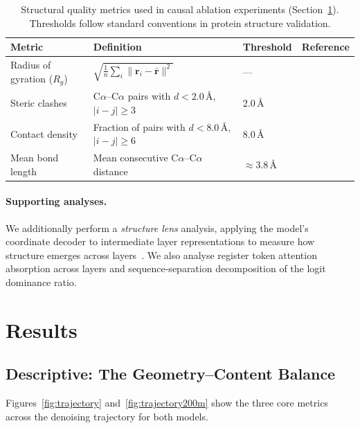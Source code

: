 \documentclass{article}
\begin{document}
\begin{table}[t]
    \centering
    \caption{Structural quality metrics used in causal ablation experiments (Section~\ref{sec:results}). Thresholds follow standard conventions in protein structure validation.}
    \label{tab:metrics}
    \begin{tabular}{llll}
        \toprule
        \textbf{Metric} & \textbf{Definition} & \textbf{Threshold} & \textbf{Reference} \\
        \midrule
        Radius of gyration ($R_g$) & $\sqrt{\frac{1}{n}\sum_i \|\mathbf{r}_i - \bar{\mathbf{r}}\|^2}$ & --- & \citet{flory1969statistical} \\
        Steric clashes & C$\alpha$--C$\alpha$ pairs with $d < 2.0$\,\AA, $|i{-}j| \geq 3$ & 2.0\,\AA & \citet{williams2018molprobity} \\
        Contact density & Fraction of pairs with $d < 8.0$\,\AA, $|i{-}j| \geq 6$ & 8.0\,\AA & \citet{rao2020transformer} \\
        Mean bond length & Mean consecutive C$\alpha$--C$\alpha$ distance & $\approx$3.8\,\AA & \citet{engh1991accurate} \\
        \bottomrule
    \end{tabular}
\end{table}

\paragraph{Supporting analyses.}
We additionally perform a \emph{structure lens} analysis, applying the model's coordinate decoder to intermediate layer representations to measure how structure emerges across layers~\citep{nostalgebraist2020logitlens}.
We also analyse register token attention absorption across layers and sequence-separation decomposition of the logit dominance ratio.

\section{Results}
\label{sec:results}

\subsection{Descriptive: The Geometry--Content Balance}

Figures~\ref{fig:trajectory} and~\ref{fig:trajectory200m} show the three core metrics across the denoising trajectory for both models.
\end{document}

